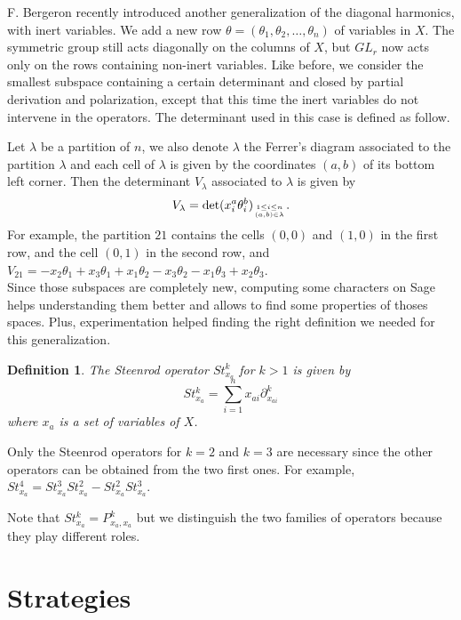 \documentclass[letter,12pt]{article}
\newcommand{\pauline}[1]{\todo[linecolor=blue,backgroundcolor=blue!25,bordercolor=blue]{#1}}
\newtheorem{definition}{Definition}
\begin{document}
	F. Bergeron recently introduced another generalization of the diagonal harmonics, with inert variables. We add a new row $\theta = (\theta_1, \theta_2, \dots, \theta_n)$ of variables in $X$. The symmetric group still acts diagonally on the columns of $X$, but $GL_r$ now acts only on the rows containing non-inert variables. Like before, we consider the smallest subspace containing a certain determinant and closed by partial derivation and polarization, except that this time the inert variables do not intervene in the operators. The determinant used in this case is defined as follow.   
	 
	Let $\lambda$ be a partition of $n$, we also denote $\lambda$ the Ferrer's diagram associated to the partition $\lambda$ and each cell of $\lambda$ is given by the coordinates $(a,b)$ of its bottom left corner. Then the determinant $V_{\lambda}$ associated to $\lambda$ is given by $$V_{\lambda} = \det (x_i^a \theta_i^b)_{1 \leq i \leq n \atop (a,b) \in \lambda} .$$
	For example, the partition $21$ contains the cells $(0,0)$ and $(1,0)$ in the first row, and the cell $(0,1)$ in the second row, and $V_{21} = -x_2\theta_1 + x_3\theta_1 + x_1\theta_2 - x_3\theta_2 - x_1\theta_3 + x_2\theta_3$. \\
	
	Since those subspaces are completely new, computing some characters on Sage helps understanding them better and allows to find some properties of thoses spaces. 
	Plus, experimentation helped finding the right definition we needed for this generalization.
	
	\begin{definition} \pauline{find the right place for Steenrod op}
		The \emph{Steenrod operator} $St_{x_a}^k$ for $k>1$ is given by
		$$St_{x_a}^k = \sum_{i=1}^{n} x_{ai} \partial_{x_{ai}}^k$$
		where $x_a$ is a set of variables of $X$. 
	\end{definition}


	Only the Steenrod operators for $k=2$ and $k=3$ are necessary since the other operators can be obtained from the two first ones. For example, $St_{x_a}^4 = St_{x_a}^3St_{x_a}^2 - St_{x_a}^2St_{x_a}^3$. 

	Note that $St_{x_a}^k = P_{x_a,x_a}^k$ but we distinguish the two families of operators because they play different roles. 
	
	\section{Strategies}
	
\end{document}
